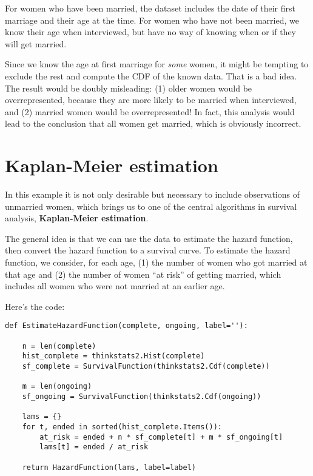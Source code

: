 \documentclass[12pt]{book}
\begin{document}
For women who have been married, the dataset includes the date
of their first marriage and their age at the time.
For women who have not been married, we know their age when interviewed,
but have no way of knowing when or if they will get married.

Since we know the age at first marriage for {\em some} women, it
might be tempting to exclude the rest and compute the CDF of
the known data.  That is a bad idea.  The result would
be doubly misleading: (1) older women would be overrepresented,
because they are more likely to be married when interviewed,
and (2) married women would be overrepresented!  In fact, this
analysis would lead to the conclusion that all women get married,
which is obviously incorrect.


\section{Kaplan-Meier estimation}

In this example it is not only desirable but necessary to include
observations of unmarried women, which brings us to one of the central
algorithms in survival analysis, {\bf Kaplan-Meier estimation}.

The general idea is that we can use the data to estimate the hazard
function, then convert the hazard function to a survival curve.
To estimate the hazard function, we consider, for each age,
(1) the number of women who got married at that age and (2) the number
of women ``at risk'' of getting married, which includes all women
who were not married at an earlier age.

Here's the code:

\begin{verbatim}
def EstimateHazardFunction(complete, ongoing, label=''):

    n = len(complete)
    hist_complete = thinkstats2.Hist(complete)
    sf_complete = SurvivalFunction(thinkstats2.Cdf(complete))

    m = len(ongoing)
    sf_ongoing = SurvivalFunction(thinkstats2.Cdf(ongoing))

    lams = {}
    for t, ended in sorted(hist_complete.Items()):
        at_risk = ended + n * sf_complete[t] + m * sf_ongoing[t]
        lams[t] = ended / at_risk

    return HazardFunction(lams, label=label)
\end{verbatim}
\end{document}
